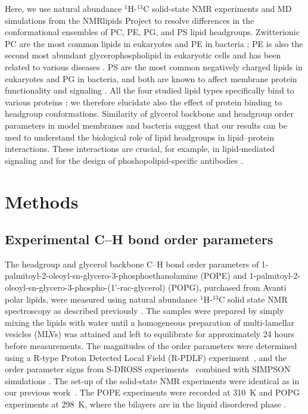 \documentclass[aps,prl,superscriptaddress,twocolumn]{revtex4}
\begin{document}
Here, we use natural abundance $^1$H-$^{13}$C solid-state NMR experiments %
and MD simulations from the NMRlipids Project
to resolve differences in the conformational ensembles of PC, PE, PG, and PS lipid headgroups.
Zwitterionic PC are the most common lipids in eukaryotes and PE in bacteria \cite{vanmeer08,sohlenkamp16};
PE is also the second most abundant glycerophospholipid in eukaryotic cells
and has been related to various diseases \cite{vance15,calzada16,patel17}.
PS are the most common negatively charged lipids in eukaryotes and PG in bacteria,
and both are known to affect membrane protein functionality and signaling \cite{lemmon08,leventis10,sohlenkamp16,hariharan18}.
All the four studied lipid types specifically bind to various proteins \cite{yeagle14};
we therefore elucidate also the effect of protein binding to headgroup conformations.
Similarity of glycerol backbone and headgroup order parameters in model membranes and bacteria \cite{gally81,scherer87,seelig90}
suggest that our results can be used to 
understand the biological role of lipid headgroups in lipid--protein interactions.
These interactions are crucial, for example, in lipid-mediated signaling \cite{lemmon08} and for the
design of phoshopolipid-specific antibodies \cite{vigant15}. 


\section{Methods}
\subsection{Experimental C--H bond order parameters}
The headgroup and glycerol backbone C--H bond order parameters of 1-palmitoyl-2-oleoyl-sn-glycero-3-phosphoethanolamine (POPE) and 1-palmitoyl-2-oleoyl-sn-glycero-3-phospho-(1'-rac-glycerol) (POPG), purchased from Avanti polar lipids, were measured using natural abundance $^1$H-$^{13}$C solid state NMR spectroscopy as described previously \cite{ferreira13,ferreira16}. The samples were prepared by simply mixing the lipids with water until a homogeneous preparation of multi-lamellar vesicles (MLVs) was attained and left to equilibrate for approximately 24 hours before measurements. The magnitudes of the order parameters were determined using a R-type Proton Detected Local Field (R-PDLF) experiment~\cite{dvinskikh04}, and the order parameter signs from S-DROSS experiments~\cite{gross97} combined with SIMPSON simulations \cite{bak00}.
The set-up of the solid-state NMR experiments were identical as in our previous work~\cite{antila19}. The POPE experiments were recorded at 310~K and POPG experiments at 298~K, where the bilayers are in the liquid disordered phase \cite{marsh13}.
\end{document}
